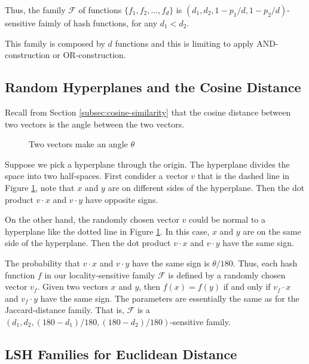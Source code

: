 Thus, the family $\boldsymbol{\mathcal{F}}$ of functions $\{f_1, f_2, \dots, f_d\}$ is $(d_1, d_2, 1- p_1/d, 1 - p_2/d)$-sensitive faimly of hash functions, for any $d_1 < d_2$.

This family is composed by $d$ functions and this is limiting to apply AND-construction or OR-construction. 

\subsection{Random Hyperplanes and the Cosine Distance}\label{subsec:random-hyperplanes-and-the-cosine-distance}

Recall from Section \ref{subsec:cosine-similarity} that the cosine distance between two vectors is the angle between the two vectors. 

\begin{figure}[H]
\centering
\scalebox{1}{
    
}
\caption{Two vectors make an angle $\theta$}
\label{fig:4-two-vectors}
\end{figure}

Suppose we pick a hyperplane through the origin. The hyperplane divides the space into two half-spaces. First condider a vector $v$ that is the dashed line in Figure \ref{fig:4-two-vectors}, note that $x$ and $y$ are on different sides of the hyperplane. Then the dot product $v \cdot x$ and $v \cdot y$ have opposite signs.

On the other hand, the randomly chosen vector $v$ could be normal to a hyperplane like the dotted line in Figure \ref{fig:4-two-vectors}. In this case, $x$ and $y$ are on the same side of the hyperplane. Then the dot product $v \cdot x$ and $v \cdot y$ have the same sign.

The probability that $v \cdot x$ and $v \cdot y$ have the same sign is $\theta / 180$. Thus, each hash function $f$ in our locality-sensitive family $\boldsymbol{\mathcal{F}}$ is defined by a randomly chosen vector $v_f$. Given two vectors $x$ and $y$, then $f(x) = f(y)$ if and only if $v_f \cdot x$ and $v_f \cdot y$ have the same sign. The parameters are essentially the same as for the Jaccard-distance family. That is, $\boldsymbol{\mathcal{F}}$ is a $(d_1, d_2, (180-d_1)/180, (180-d_2)/180)$-sensitive family.

\subsection{LSH Families for Euclidean Distance}\label{subsec:lsh-families-for-euclidean-distance}

